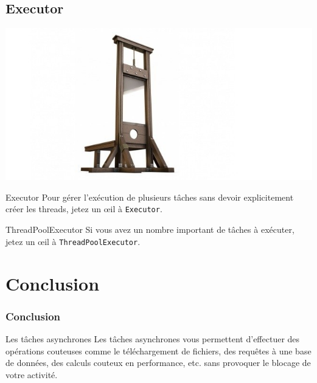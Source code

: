 \documentclass{beamer}
\begin{document}
\subsection{Executor}
\begin{frame}
\begin{center}
\includegraphics[scale=0.25]{executor.jpg}
\end{center}
\begin{block}{Executor}
Pour gérer l'exécution de plusieurs tâches sans devoir explicitement créer les threads, jetez un œil à \verb!Executor!.
\end{block}
\begin{block}{ThreadPoolExecutor}
Si vous avez un nombre important de tâches à exécuter, jetez un œil à \verb!ThreadPoolExecutor!.
\end{block}

\end{frame}


\section{Conclusion}

\begin{frame}
\frametitle{Conclusion}
\begin{block}{Les tâches asynchrones}
Les tâches asynchrones vous permettent d'effectuer des opérations couteuses comme le téléchargement de fichiers, des requêtes à une base de données, des calculs couteux en performance, etc. sans provoquer le blocage de votre activité.
\end{block}
\end{frame}
\end{document}
